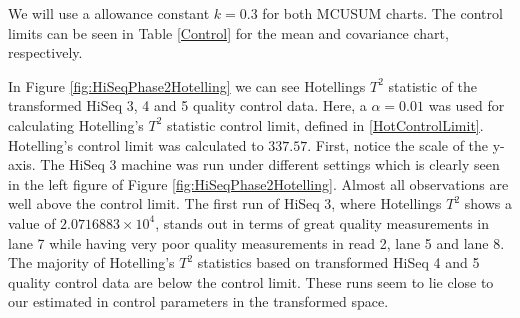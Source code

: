 \documentclass[a4paper,11pt,fleqn,twoside,notitlepage]{report}
\begin{document}
We will use a allowance constant $k=0.3$ for both MCUSUM charts. The control limits can be seen in Table \ref{Control} for the mean and covariance chart, respectively.

In Figure \ref{fig:HiSeqPhase2Hotelling} we can see Hotellings $T^2$ statistic of the transformed HiSeq 3, 4 and 5 quality control data. Here, a $\alpha=0.01$ was used for calculating Hotelling's $T^2$ statistic control limit, defined in \eqref{HotControlLimit}. Hotelling's control limit was calculated to $337.57$. First, notice the scale of the y-axis. The HiSeq 3 machine was run under different settings which is clearly seen in the left figure of Figure \ref{fig:HiSeqPhase2Hotelling}. Almost all observations are well above the control limit. The first run of HiSeq 3, where Hotellings $T^2$ shows a value of $\ensuremath{2.0716883\times 10^{4}}$, stands out in terms of great quality measurements in lane 7 while having very poor quality measurements in read 2, lane 5 and lane 8. The majority of Hotelling's $T^2$ statistics based on transformed HiSeq 4 and 5 quality control data are below the control limit. These runs seem to lie close to our estimated in control parameters in the transformed space.
\end{document}
